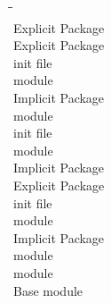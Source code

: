 \documentclass{article}
\begin{document}
\begin{tabbing}
\hspace{1em}\=\hspace{1em}\=\hspace{1em}\=\hspace{11em}\=\\\kill
{}          \>\>\>\>  Explicit Package \+\\
            \>\>\>  Explicit Package \+\\
       \>\>  init file          \\
         \>\>  module           \-\\
            \>\>\>  Implicit Package \+\\
         \>\>  module           \-\\
     \>\>\>  init file          \\
       \>\>\>  module           \-\\
          \>\>\>\>  Implicit Package \+\\
            \>\>\>  Explicit Package \+\\
       \>\>  init file          \\
         \>\>  module           \-\\
            \>\>\>  Implicit Package \+\\
         \>\>  module           \-\\
       \>\>\>  module           \-\\
     \>\>\>\>  Base module        \\
\end{tabbing}
\end{document}
